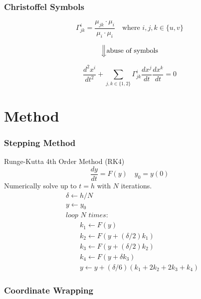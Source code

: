 \documentclass{beamer}
\begin{document}
\begin{frame}
	
	\frametitle{Christoffel Symbols}
	
	\begin{equation*} 
		\Gamma^i_{jk} = \frac{\mu_{jk}\cdot\mu_i}{\mu_i\cdot\mu_i} \quad\text{where } i,j,k \in \{u,v\}
	\end{equation*}
	
	$$\Big\Downarrow \text{abuse of symbols}$$
	
	\begin{equation*}
		\frac{d^2x^i}{dt^2} + \sum_{j,k \in \{1,2\}} \Gamma^i_{jk}\frac{dx^j}{dt}\frac{dx^k}{dt} = 0
	\end{equation*}
	
\end{frame}

\section{Method}

\begin{frame}

	\frametitle{Stepping Method}
	
	Runge-Kutta 4th Order Method (RK4)
	\begin{equation*}
		\frac{dy}{dt} = F(y) \quad y_0 = y(0)
	\end{equation*}
	Numerically solve up to $t=h$ with $N$ iterations.
	\begin{align*}
		& \delta \gets h/N \\
		& y \gets y_0 \\
		& \textit{loop } N \textit{ times:} \\
		& \quad\quad k_1 \gets F(y) \\
		& \quad\quad k_2 \gets F\left(y+(\delta/2)k_1\right) \\
		& \quad\quad k_3 \gets F\left(y+(\delta/2)k_2\right) \\
		& \quad\quad k_4 \gets F\left(y + \delta k_3\right) \\
		& \quad\quad y \gets y+(\delta/6)(k_1+2k_2+2k_3+k_4)
	\end{align*}

\end{frame}


\begin{frame}
	
	\frametitle{Coordinate Wrapping}
	
	\begin{figure}
		
	\end{figure}
	
\end{frame}
\end{document}
